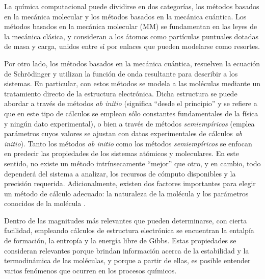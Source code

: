 \documentclass[12pt]{article}
\begin{document}
La química computacional puede dividirse en dos categorías, los métodos basados en la mecánica molecular y los métodos basados en la mecánica cuántica.
Los métodos basados en la mecánica molecular (MM) se fundamentan en las leyes de la mecánica
clásica, y consideran a los átomos como partículas puntuales dotadas de masa y carga, unidos
entre sí por enlaces que pueden modelarse como resortes.

Por otro lado, los métodos basados en la mecánica cuántica, resuelven la ecuación de Schrödinger
y utilizan la función de onda resultante
para describir a los sistemas.
En particular, con estos métodos se modela a las moléculas mediante un tratamiento directo
de la estructura electrónica. Dicha estructura se puede abordar a través de métodos
\textit{ab initio} (significa ``desde el principio'' y se refiere a que en
este tipo de cálculos se emplean sólo constantes fundamentales de la física y ningún dato experimental),
o bien a través de métodos  \textit{semiempíricos} (emplea parámetros cuyos valores se ajustan con
datos experimentales de cálculos \textit{ab initio}). Tanto los métodos \textit{ab initio} como los
métodos \textit{semiempíricos} se enfocan en predecir las propiedades de los sistemas atómicos y
moleculares. En este sentido, no existe un método intrínsecamente ``mejor'' que otro, y en cambio,
todo dependerá del sistema a analizar, los recursos de cómputo disponibles y la precisión requerida. Adicionalmente, existen dos factores importantes para elegir un método de cálculo adecuado: la naturaleza de la molécula y los parámetros conocidos de la molécula \cite{Cuevas2003}. 

Dentro de las magnitudes más relevantes que pueden determinarse, con cierta facilidad, empleando
cálculos de estructura electrónica se encuentran la entalpía de formación, la entropía
y la energía libre de Gibbs. Estas propiedades se consideran relevantes porque brindan información acerca de la estabilidad y la termodinámica de las moléculas, y porque a partir de ellas, es posible entender varios fenómenos que ocurren en los procesos químicos.
\end{document}
